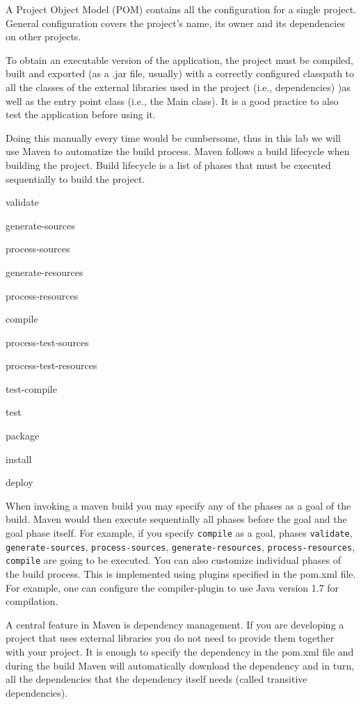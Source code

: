 \documentclass{article}
\begin{document}
A Project Object Model (POM) contains all the configuration for a
single project. General configuration covers the project's name, its
owner and its dependencies on other projects. 

To obtain an executable version of the application, the project must be
compiled, built and exported (as a .jar file, usually) with a
correctly configured classpath to all the classes of the
external libraries used in the project (i.e., dependencies) )as well 
as the entry point class (i.e., the Main class). It is a
good practice to also test the application before using it.

Doing this manually every time would be cumbersome, thus in this
lab we will use Maven to automatize the build process.
Maven follows a build lifecycle when building the project. Build
lifecycle is a list of phases that must be executed sequentially to
build the project.

\begin{compactitem}
\item validate
\item generate-sources
\item process-sources
\item generate-resources
\item process-resources
\item compile
\item process-test-sources
\item process-test-resources
\item test-compile
\item test
\item package
\item install
\item deploy
\end{compactitem}

When invoking a maven build you may specify any of the phases as a
goal of the build. Maven would then execute sequentially all phases
before the goal and the goal phase itself. For example, if you specify
\texttt{compile} as a goal, phases \texttt{validate},
\texttt{generate-sources}, \texttt{process-sources},
\texttt{generate-resources}, \texttt{process-resources},
\texttt{compile} are going to be executed.
You can also customize individual phases of the build process. This is
implemented using plugins specified in the pom.xml file. For example,
one can configure the compiler-plugin to use Java version 1.7 for
compilation.

A central feature in Maven is dependency management. If you are
developing a project that uses external libraries you do not need to
provide them together with your project. It is enough to specify the
dependency in the pom.xml file and  during the build Maven will
automatically download the dependency and in turn, all the
dependencies that the dependency itself needs (called transitive
dependencies).
\end{document}
